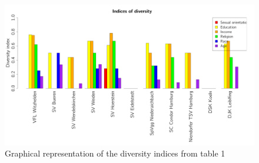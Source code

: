 \documentclass[	
	12pt, %
	a4paper, %
]{scrartcl}\usepackage[]{graphicx}\usepackage[]{color}
\newenvironment{knitrout}{}{} %
\begin{document}
\begin{knitrout}\footnotesize
{}\color{fgcolor}\begin{figure}[]


{\centering \includegraphics[width=1\linewidth]{figure/beamer-indices} 

}

\caption[Graphical representation of the diversity indices from table 1]{Graphical representation of the diversity indices from table 1\label{fig:indices}}
\end{figure}


\end{knitrout}





\clearpage
\end{document}
